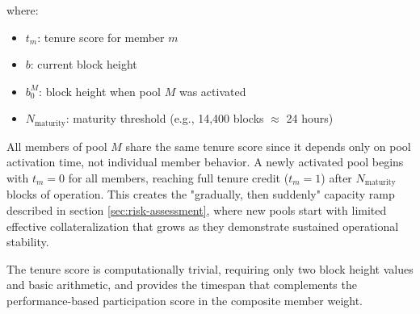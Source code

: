 where:
\begin{itemize}
    \item $t_m$: tenure score for member $m$
    \item $b$: current block height
    \item $b_0^M$: block height when pool $M$ was activated
    \item $N_{\text{maturity}}$: maturity threshold (e.g., 14,400 blocks $\approx$ 24 hours)
\end{itemize}

All members of pool $M$ share the same tenure score since it depends only on pool activation time, not individual member behavior. A newly activated pool begins with $t_m = 0$ for all members, reaching full tenure credit ($t_m = 1$) after $N_{\text{maturity}}$ blocks of operation. This creates the "gradually, then suddenly" capacity ramp described in section \ref{sec:risk-assessment}, where new pools start with limited effective collateralization that grows as they demonstrate sustained operational stability.

The tenure score is computationally trivial, requiring only two block height values and basic arithmetic, and provides the timespan that complements the performance-based participation score in the composite member weight.
